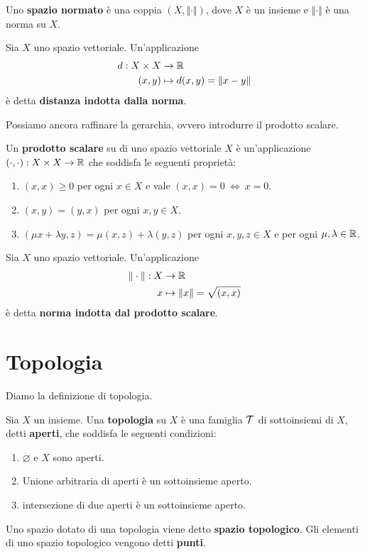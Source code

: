 \begin{defn}
Uno \textbf{spazio normato} è una coppia $\left(X,\Vert\cdot\Vert\right)$, dove $X$ è un insieme e $\Vert\cdot\Vert$ è una norma su $X$.
\end{defn}

\begin{defn}
Sia $X$ uno spazio vettoriale. Un'applicazione
\begin{align*}
d:X\times X&\to\mathbb{R}\\
(x,y)&\mapsto d(x,y)=\Vert x-y\Vert
\end{align*}
è detta \textbf{distanza indotta dalla norma}.
\end{defn}

Possiamo ancora raffinare la gerarchia, ovvero introdurre il prodotto scalare.

\begin{defn}
Un \textbf{prodotto scalare} su di uno spazio vettoriale $X$ è un'applicazione $(\cdot,\cdot):X\times X\to\mathbb{R}$ che soddisfa le seguenti proprietà:
\begin{enumerate}
    \item $(x,x)\geq0$ per ogni $x\in X$ e vale $(x,x)=0\ \Leftrightarrow\ x=0$.
    \item $(x,y)=(y,x)$ per ogni $x,y\in X$.
    \item $(\mu x+\lambda y,z)=\mu(x,z)+\lambda(y,z)$ per ogni $x,y,z\in X$ e per ogni $\mu,\lambda\in\mathbb{R}$.
\end{enumerate}
\end{defn}

\begin{defn}
Sia $X$ uno spazio vettoriale. Un'applicazione
\begin{align*}
\Vert\cdot\Vert:X&\to\mathbb{R}\\
x&\mapsto \Vert x\Vert=\sqrt{(x,x)}
\end{align*}
è detta \textbf{norma indotta dal prodotto scalare}.
\end{defn}


\section{Topologia}

Diamo la definizione di topologia.

\begin{defn}
Sia $X$ un insieme. Una \textbf{topologia} su $X$ è una famiglia       $\mathcal{T}$ di sottoinsiemi di $X$, detti \textbf{aperti}, che soddisfa le seguenti condizioni:
\begin{enumerate}
    \item $\varnothing$ e $X$ sono aperti.
    \item Unione arbitraria di aperti è un sottoinsieme aperto.
    \item intersezione di due aperti è un sottoinsieme aperto.
\end{enumerate}
Uno spazio dotato di una topologia viene detto \textbf{spazio topologico}. Gli elementi di uno spazio topologico vengono detti \textbf{punti}.
\end{defn}

